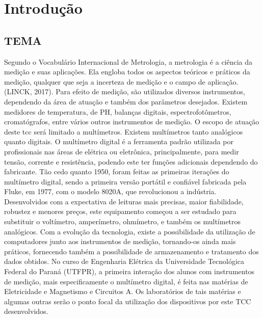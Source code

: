 
\chapter{Introdução}\label{cap:introducao}

\section{TEMA}\label{sec:tema}
Segundo o Vocabulário Internacional de Metrologia, a metrologia é a ciência da medição e suas aplicações. Ela engloba todos os aspectos teóricos e práticos da medição, qualquer que seja a incerteza de medição e o campo de aplicação. (LINCK, 2017).
Para efeito de medição, são utilizados diversos instrumentos, dependendo da área de atuação e também dos parâmetros desejados. Existem medidores de temperatura, de PH, balanças digitais, espectrofotômetros, cromatógrafos, entre vários outros instrumentos de medição. O escopo de atuação deste \gls{tcc} será limitado a multímetros. Existem multímetros tanto analógicos quanto digitais.
O multímetro digital é a ferramenta padrão utilizada por profissionais nas áreas de elétrica ou eletrônica, principalmente, para medir tensão, corrente e resistência, podendo este ter funções adicionais dependendo do fabricante.
	Tão cedo quanto 1950, foram feitas as primeiras iterações do multímetro digital, sendo a primeira versão portátil e confiável fabricada pela Fluke, em 1977, com o modelo 8020A, que revolucionou a indústria. Desenvolvidos com a expectativa de leituras mais precisas, maior fiabilidade, robustez e menores preços, este equipamento começou a ser estudado para substituir o voltímetro, amperímetro, ohmímetro, e também os multímetros analógicos. 
	Com a evolução da tecnologia, existe a possibilidade da utilização de computadores junto aos instrumentos de medição, tornando-os ainda mais práticos, fornecendo também a possibilidade de armazenamento e tratamento dos dados obtidos.
	No curso de Engenharia Elétrica da Universidade Tecnológica Federal do Paraná (UTFPR), a primeira interação dos alunos com instrumentos de medição, mais especificamente o multímetro digital, é feita nas matérias de Eletricidade e Magnetismo e Circuitos A. Os laboratórios de tais matérias e algumas outras serão o ponto focal da utilização dos dispositivos por este TCC desenvolvidos.

